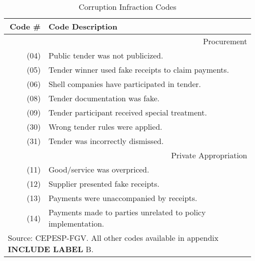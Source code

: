 \documentclass[11pt]{article}
\author{Andre Assumpcao}
\newcommand\T{\rule{0pt}{2.6ex}}       %
\newcommand\B{\rule[-1.2ex]{0pt}{0pt}} %
\begin{document}
\begin{table}[!htbp]
  \caption{\label{tab:corruptioncodes} Corruption Infraction Codes}
  \centering
  \small
  \begin{tabular}{r|l}
  \hline

  \hline
  Code \# & Code Description                                          \T \B \\
  \hline
  \multicolumn{2}{r}{Procurement}                                     \T \B \\
  \hline
  (04) & Public tender was not publicized.                            \T \B \\
  (05) & Tender winner used fake receipts to claim payments.          \T \B \\
  (06) & Shell companies have participated in tender.                 \T \B \\
  (08) & Tender documentation was fake.                               \T \B \\
  (09) & Tender participant received special treatment.               \T \B \\
  (30) & Wrong tender rules were applied.                             \T \B \\
  (31) & Tender was incorrectly dismissed.                            \T \B \\
  \hline
  \multicolumn{2}{r}{Private Appropriation}                           \T \B \\
  \hline
  (11) & Good/service was overpriced.                                 \T \B \\
  (12) & Supplier presented fake receipts.                            \T \B \\
  (13) & Payments were unaccompanied by receipts.                     \T \B \\
  (14) & Payments made to parties unrelated to policy implementation. \T \B \\
  \hline

  \hline
  \multicolumn{2}{l}{\footnotesize Source: CEPESP-FGV. All other codes available in appendix {\bf INCLUDE LABEL} B.} \T
  \end{tabular}
\end{table}
\end{document}
